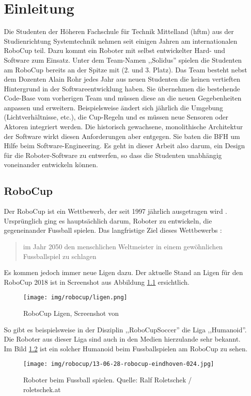 \chapter{Einleitung}
Die Studenten der Höheren Fachschule für Technik Mittelland (\acrshort{hftm}) aus der Studienrichtung Systemtechnik nehmen seit einigen Jahren am internationalen RoboCup teil. Dazu kommt ein Roboter mit selbst entwickelter Hard- und Software zum Einsatz. Unter dem Team-Namen ,,Solidus'' spielen die Studenten am RoboCup bereits an der Spitze mit (2. und 3. Platz). Das Team besteht nebst dem Dozenten Alain Rohr jedes Jahr aus neuen Studenten die keinen vertieften Hintergrund in der Softwareentwicklung haben. Sie übernehmen die bestehende Code-Base vom vorherigen Team und müssen diese an die neuen Gegebenheiten anpassen und erweitern. Beispielsweise ändert sich jährlich die Umgebung (Lichtverhältnisse, etc.), die Cup-Regeln und es müssen neue Sensoren oder Aktoren integriert werden. Die historisch gewachsene, monolithische Architektur der Software wirkt diesen Anforderungen aber entgegen.
Sie baten die BFH um Hilfe beim Software-Engineering. Es geht in dieser Arbeit also darum, ein Design für die Roboter-Software zu entwerfen, so dass die Studenten unabhängig voneinander entwickeln können.
\section{RoboCup}
Der RoboCup ist ein Wettbewerb, der seit 1997 jährlich ausgetragen wird \cite{wikipedia-robocup}. Ursprünglich ging es hauptsächlich darum, Roboter zu entwickeln, die gegeneinander Fussball spielen. Das langfristige Ziel dieses Wettbewerbs \cite{wikipedia-roboterfussball}: 
\begin{quote}
	im Jahr 2050 den menschlichen Weltmeister in einem gewöhnlichen Fussballspiel zu schlagen
\end{quote}
Es kommen jedoch immer neue Ligen dazu. Der aktuelle Stand an Ligen für den RoboCup 2018 ist in Screenshot aus Abbildung \ref{fig:robocup_ligen} ersichtlich.
\begin{figure}[H]
	\centering
	\texttt{[image: img/robocup/ligen.png]}
	\caption{RoboCup Ligen, Screenshot von \cite{www.robocup.org}}
	\label{fig:robocup_ligen}
\end{figure} 
So gibt es beispielsweise in der Disziplin ,,RoboCupSoccer'' die Liga ,,Humanoid''. Die Roboter aus dieser Liga sind auch in den Medien hierzulande sehr bekannt. Im Bild \ref{fig:robocup_fussball} ist ein solcher Humanoid beim Fussballspielen am RoboCup zu sehen.
\begin{figure}[H]
	\centering
	\texttt{[image: img/robocup/13-06-28-robocup-eindhoven-024.jpg]}
	\caption{Roboter beim Fussball spielen. Quelle: Ralf Roletschek / roletschek.at \cite{robocup2013}}
	\label{fig:robocup_fussball}
\end{figure}
